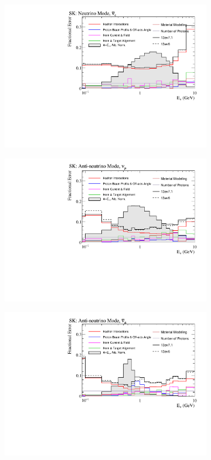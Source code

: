 \begin{figure}
\begin{subfigure}{.49\textwidth}
\end{subfigure}
\begin{subfigure}{.49\textwidth}
  \centering
  \includegraphics[width=0.99\linewidth]{figs/flux_error_t2k_sk_fhc_nuebar}
\end{subfigure}
\begin{subfigure}{.49\textwidth}
  \centering
  \includegraphics[width=0.99\linewidth]{figs/flux_error_t2k_sk_rhc_numu}
\end{subfigure}
\begin{subfigure}{.49\textwidth}
  \centering
  \includegraphics[width=0.99\linewidth]{figs/flux_error_t2k_sk_rhc_numubar}

\end{subfigure}
\end{figure}
